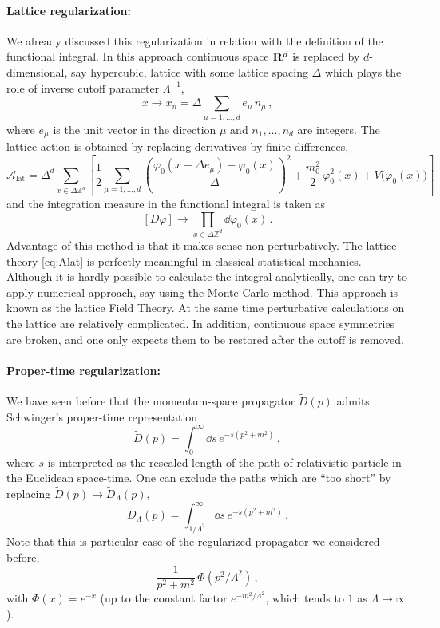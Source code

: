 \paragraph{Lattice regularization:} We already discussed this regularization in
relation with the definition of the functional integral. In this approach
continuous space $\mathbf{R}^d$ is replaced by $d$-dimensional, say hypercubic, lattice
with some lattice spacing $\Delta$ which plays the role of inverse cutoff
parameter $\Lambda^{-1}$,
\[
x\to x_n=\Delta\sum_{\mu=1,\dots,d}e_\mu\,n_\mu\,,
\]
where $e_\mu$ is the unit vector in the direction $\mu$ and $n_1,\dots,n_d$ are
integers. The lattice action is obtained by replacing derivatives by finite
differences,
\begin{equation}\label{eq:Alat}
\mathcal A_{\text{lat}}=\Delta^d\sum_{x\in\Delta\mathbb Z^d}\left[\frac12\sum_{\mu=1,\dots,d}\left(\frac{\varphi_0(x+\Delta e_\mu)-\varphi_0(x)}\Delta\right)^2
+\frac{m_0^2}2\,\varphi_0^2(x)+V\bigl(\varphi_0(x)\bigr)\right]
\end{equation}
and the integration measure in the functional integral is taken as
\[
[D\varphi]\to\prod_{x\in\Delta\mathbb Z^d}\dd\varphi_0(x)\,.
\]
Advantage of this method is that it makes sense non-perturbatively. The lattice
theory \eqref{eq:Alat} is perfectly meaningful in classical statistical
mechanics. Although it is hardly possible to calculate the integral
analytically, one can try to apply numerical approach, say using the
Monte-Carlo method. This approach is known as the lattice Field Theory. At the
same time perturbative calculations on the lattice are relatively complicated.
In addition, continuous space symmetries are broken, and one only expects them
to be restored after the cutoff is removed.

\paragraph{Proper-time regularization:} We have seen before that the
momentum-space propagator $\tilde D(p)$ admits Schwinger's proper-time
representation
\[
\tilde D(p)=\int_0^\infty \dd s\,e^{-s(p^2+m^2)}\,,
\]
where $s$ is interpreted as the rescaled length of the path of relativistic
particle in the Euclidean space-time. One can exclude the paths which are
``too short'' by replacing $\tilde D(p)\to\tilde D_\Lambda(p)$,
\[
\tilde D_\Lambda(p)=\int_{1/\Lambda^2}^\infty \dd s\,e^{-s(p^2+m^2)}\,.
\]
Note that this is particular case of the regularized propagator we considered
before,
\begin{equation}\label{eq:regprop}
\frac1{p^2+m^2}\,\Phi(p^2/\Lambda^2)\,,
\end{equation}
with $\Phi(x)=e^{-x}$ (up to the constant factor $e^{-m^2/\Lambda^2}$, which
tends to $1$ as $\Lambda\to\infty$).

